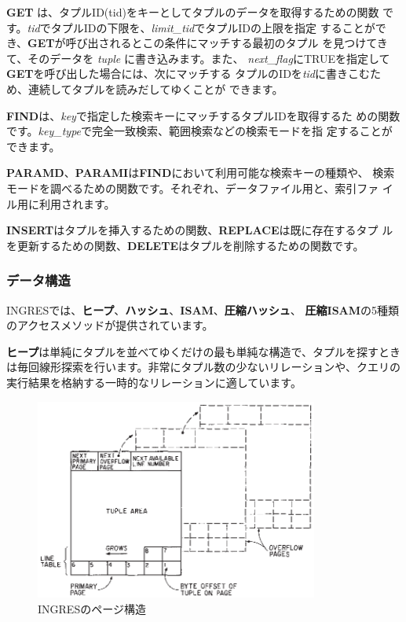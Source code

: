 {\bf GET} は、タプルID(tid)をキーとしてタプルのデータを取得するための関数
です。{\it tid}でタプルIDの下限を、{\it limit\_tid}でタプルIDの上限を指定
することができ、{\bf GET}が呼び出されるとこの条件にマッチする最初のタプル
を見つけてきて、そのデータを {\it tuple} に書き込みます。また、{\it
next\_flag}にTRUEを指定して{\bf GET}を呼び出した場合には、次にマッチする
タプルのIDを{\it tid}に書きこむため、連続してタプルを読みだしてゆくことが
できます。

{\bf FIND}は、{\it key}で指定した検索キーにマッチするタプルIDを取得するた
めの関数です。{\it key\_type}で完全一致検索、範囲検索などの検索モードを指
定することができます。

{\bf PARAMD}、{\bf PARAMI}は{\bf FIND}において利用可能な検索キーの種類や、
検索モードを調べるための関数です。それぞれ、データファイル用と、索引ファ
イル用に利用されます。

{\bf INSERT}はタプルを挿入するための関数、{\bf REPLACE}は既に存在するタプ
ルを更新するための関数、{\bf DELETE}はタプルを削除するための関数です。

\subsubsection{データ構造}

INGRESでは、{\bf ヒープ}、{\bf ハッシュ}、{\bf ISAM}、{\bf 圧縮ハッシュ}、
{\bf 圧縮ISAM}の5種類のアクセスメソッドが提供されています。

{\bf ヒープ}は単純にタプルを並べてゆくだけの最も単純な構造で、タプルを探すとき
は毎回線形探索を行います。非常にタプル数の少ないリレーションや、クエリの
実行結果を格納する一時的なリレーションに適しています。

\begin{figure}[tb]
 \begin{center}
  \includegraphics[height=66mm]{hayamiz/images/page-layout-ingres.eps}
  \caption{INGRESのページ構造}
  \label{174456_16Jul12}
 \end{center}
\end{figure}

